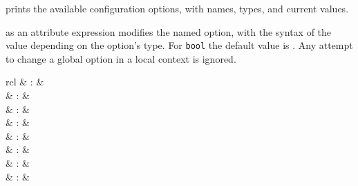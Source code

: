 \begin{isabellebody}
\begin{isamarkuptext}
  \begin{description}
  
  \item \hyperlink{command.print-configs}{\mbox{}} prints the available configuration
  options, with names, types, and current values.
  
  \item {} as an attribute expression modifies the
  named option, with the syntax of the value depending on the option's
  type.  For \verb|bool| the default value is .  Any
  attempt to change a global option in a local context is ignored.

  \end{description}%
\end{isamarkuptext}%
\isamarkuptrue%
%
\isamarkuptrue%
%
\isamarkuptrue%
%
\begin{isamarkuptext}%
\begin{matharray}{rcl}
    \hypertarget{method.unfold}{\hyperlink{method.unfold}{\mbox{}}} & : &  \\
    \hypertarget{method.fold}{\hyperlink{method.fold}{\mbox{}}} & : &  \\
    \hypertarget{method.insert}{\hyperlink{method.insert}{\mbox{}}} & : &  \\[0.5ex]
    \hypertarget{method.erule}{\hyperlink{method.erule}{\mbox{}}} & : &  \\
    \hypertarget{method.drule}{\hyperlink{method.drule}{\mbox{}}} & : &  \\
    \hypertarget{method.frule}{\hyperlink{method.frule}{\mbox{}}} & : &  \\
    \hypertarget{method.succeed}{\hyperlink{method.succeed}{\mbox{}}} & : &  \\
    \hypertarget{method.fail}{\hyperlink{method.fail}{\mbox{}}} & : &  \\
  \end{matharray}


\end{isamarkuptext}
\end{isabellebody}
